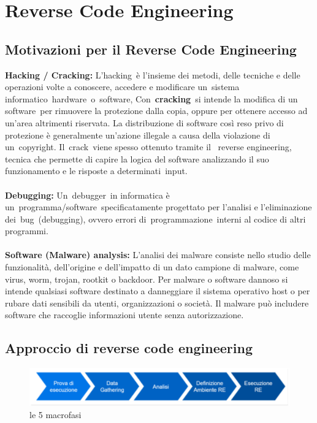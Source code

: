 \documentclass[8pt]{extarticle}
\begin{document}
\section{Reverse Code Engineering}
\subsection{Motivazioni per il Reverse Code Engineering}
\noindent
\textbf{Hacking / Cracking:}
L'hacking è l'insieme dei metodi, delle tecniche e delle operazioni volte a conoscere, accedere e 
modificare un sistema informatico hardware o software, Con \textbf{cracking} si intende la modifica di un 
software per rimuovere la protezione dalla copia, oppure per ottenere accesso ad un'area altrimenti 
riservata. La distribuzione di software così reso privo di protezione è generalmente un'azione 
illegale a causa della violazione di un copyright. Il crack viene spesso ottenuto tramite il 
reverse engineering, tecnica che permette di capire la logica del software analizzando il suo 
funzionamento e le risposte a determinati input.\\\\
\textbf{Debugging:}
Un debugger in informatica è un programma/software specificatamente progettato per l'analisi e 
l'eliminazione dei bug (debugging), ovvero errori di programmazione interni al codice di altri programmi.\\\\
\textbf{Software (Malware) analysis:}
L'analisi dei malware consiste nello studio delle funzionalità, dell'origine e dell'impatto di un dato 
campione di malware, come virus, worm, trojan, rootkit o backdoor. Per malware o software dannoso si 
intende qualsiasi software destinato a danneggiare il sistema operativo host o per rubare dati 
sensibili da utenti, organizzazioni o società. Il malware può includere software che raccoglie 
informazioni utente senza autorizzazione.
\subsection{Approccio di reverse code engineering}
\begin{figure}[H]
    \center
    \includegraphics[scale=0.3]{images/Macrofasi.png}
    \caption{le 5 macrofasi}\label{fig:1}
\end{figure}
\end{document}
